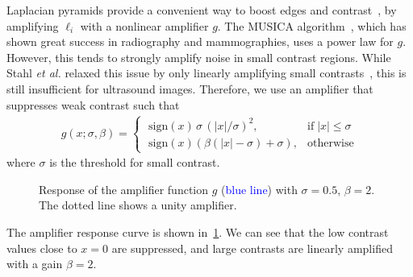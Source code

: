 Laplacian pyramids provide a convenient way to boost edges and contrast~\cite{vuylsteke_multiscale_1994, stahl_noiseresistant_1999, dippel_multiscale_2002}, by amplifying \({\boldsymbol\ell}_{i}\) with a nonlinear amplifier \(g\).
The MUSICA algorithm~\cite{vuylsteke_multiscale_1994}, which has shown great success in radiography and mammographies, uses a power law for \(g\).
However, this tends to strongly amplify noise in small contrast regions.
While Stahl \textit{et al.} relaxed this issue by only linearly amplifying small contrasts~\cite{stahl_noiseresistant_1999}, this is still insufficient for ultrasound images.
Therefore, we use an amplifier that suppresses weak contrast such that
\begin{align}
  g\left(x; \sigma, \beta \right) =
  \begin{cases}
    \;\mathrm{sign}\left( x \right) \, \sigma \, {\left( |x|/\sigma \right)}^2, & \text{if}\; |x| \leq \sigma \\
    \;\mathrm{sign}\left( x \right) \left( \beta \left(|x| - \sigma \right) + \sigma \right), & \text{otherwise}
  \end{cases}
\end{align}
where \(\sigma\) is the threshold for small contrast.
%
\begin{figure}[t]
  \vspace{-0.1in}
  \centering
  \caption{Response of the amplifier function \(g\) (\textcolor{blue}{blue line}) with \(\sigma=0.5\), \(\beta=2\).
  The dotted line shows a unity amplifier.}\label{fig:amp}
  \vspace{-0.1in}
\end{figure}
%
The amplifier response curve is shown in~\cref{fig:amp}.
We can see that the low contrast values close to \(x=0\) are suppressed, and large contrasts are linearly amplified with a gain \(\beta=2\).

